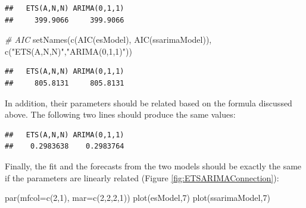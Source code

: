 \documentclass[
]{book}
\newenvironment{Shaded}{\begin{snugshade}}{\end{snugshade}}
\newcommand{\AttributeTok}[1]{\textcolor[rgb]{0.77,0.63,0.00}{#1}}
\newcommand{\CommentTok}[1]{\textcolor[rgb]{0.56,0.35,0.01}{\textit{#1}}}
\newcommand{\DecValTok}[1]{\textcolor[rgb]{0.00,0.00,0.81}{#1}}
\newcommand{\FunctionTok}[1]{\textcolor[rgb]{0.00,0.00,0.00}{#1}}
\newcommand{\NormalTok}[1]{#1}
\newcommand{\SpecialCharTok}[1]{\textcolor[rgb]{0.00,0.00,0.00}{#1}}
\newcommand{\StringTok}[1]{\textcolor[rgb]{0.31,0.60,0.02}{#1}}
\theoremstyle{definition}
\theoremstyle{definition}
\theoremstyle{definition}
\theoremstyle{definition}
\theoremstyle{remark}
\begin{document}
\begin{verbatim}
##   ETS(A,N,N) ARIMA(0,1,1) 
##     399.9066     399.9066
\end{verbatim}

\begin{Shaded}
\begin{Highlighting}[]
\CommentTok{\# AIC}
\FunctionTok{setNames}\NormalTok{(}\FunctionTok{c}\NormalTok{(}\FunctionTok{AIC}\NormalTok{(esModel), }\FunctionTok{AIC}\NormalTok{(ssarimaModel)),}
         \FunctionTok{c}\NormalTok{(}\StringTok{"ETS(A,N,N)"}\NormalTok{,}\StringTok{"ARIMA(0,1,1)"}\NormalTok{))}
\end{Highlighting}
\end{Shaded}

\begin{verbatim}
##   ETS(A,N,N) ARIMA(0,1,1) 
##     805.8131     805.8131
\end{verbatim}

In addition, their parameters should be related based on the formula discussed above. The following two lines should produce the same values:

\begin{Shaded}
\end{Shaded}

\begin{verbatim}
##   ETS(A,N,N) ARIMA(0,1,1) 
##    0.2983638    0.2983764
\end{verbatim}

Finally, the fit and the forecasts from the two models should be exactly the same if the parameters are linearly related (Figure \ref{fig:ETSARIMAConnection}):

\begin{Shaded}
\begin{Highlighting}[]
\FunctionTok{par}\NormalTok{(}\AttributeTok{mfcol=}\FunctionTok{c}\NormalTok{(}\DecValTok{2}\NormalTok{,}\DecValTok{1}\NormalTok{), }\AttributeTok{mar=}\FunctionTok{c}\NormalTok{(}\DecValTok{2}\NormalTok{,}\DecValTok{2}\NormalTok{,}\DecValTok{2}\NormalTok{,}\DecValTok{1}\NormalTok{))}
\FunctionTok{plot}\NormalTok{(esModel,}\DecValTok{7}\NormalTok{)}
\FunctionTok{plot}\NormalTok{(ssarimaModel,}\DecValTok{7}\NormalTok{)}
\end{Highlighting}
\end{Shaded}
\end{document}
